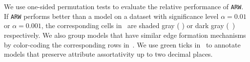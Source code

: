 We use one-sided permutation tests \cite{good2013permutation} to evaluate the relative
performance of \texttt{ARW}. If \texttt{ARW} performs better than a model on a dataset
with significance level $\alpha=0.01$ or $\alpha=0.001$, the corresponding cells in~
are shaded gray ( \lightgraybg{ }) or dark gray (~\darkgraybg{ }) respectively.
We also group models that have similar edge formation mechanisms by color-coding the
corresponding rows in~.  We use green ticks in~ to
annotate models that preserve attribute assortativity up to two decimal places.



